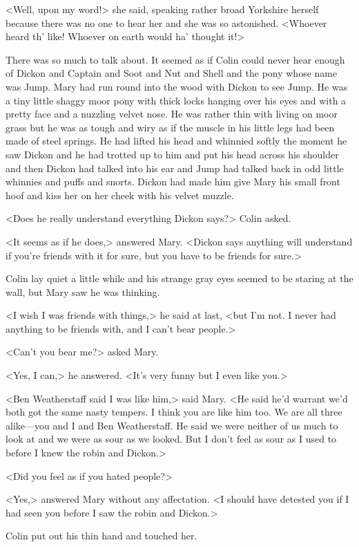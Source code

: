 <Well, upon my word!> she said, speaking rather broad Yorkshire herself because there was no one to hear her and she was so astonished. <Whoever heard th' like! Whoever on earth would ha' thought it!>

There was so much to talk about. It seemed as if Colin could never hear enough of Dickon and Captain and Soot and Nut and Shell and the pony whose name was Jump. Mary had run round into the wood with Dickon to see Jump. He was a tiny little shaggy moor pony with thick locks hanging over his eyes and with a pretty face and a nuzzling velvet nose. He was rather thin with living on moor grass but he was as tough and wiry as if the muscle in his little legs had been made of steel springs. He had lifted his head and whinnied softly the moment he saw Dickon and he had trotted up to him and put his head across his shoulder and then Dickon had talked into his ear and Jump had talked back in odd little whinnies and puffs and snorts. Dickon had made him give Mary his small front hoof and kiss her on her cheek with his velvet muzzle.

<Does he really understand everything Dickon says?> Colin asked.

<It seems as if he does,> answered Mary. <Dickon says anything will understand if you're friends with it for sure, but you have to be friends for sure.>

Colin lay quiet a little while and his strange gray eyes seemed to be staring at the wall, but Mary saw he was thinking.

<I wish I was friends with things,> he said at last, <but I'm not. I never had anything to be friends with, and I can't bear people.>

<Can't you bear me?> asked Mary.

<Yes, I can,> he answered. <It's very funny but I even like you.>

<Ben Weatherstaff said I was like him,> said Mary. <He said he'd warrant we'd both got the same nasty tempers. I think you are like him too. We are all three alike—you and I and Ben Weatherstaff. He said we were neither of us much to look at and we were as sour as we looked. But I don't feel as sour as I used to before I knew the robin and Dickon.>

<Did you feel as if you hated people?>

<Yes,> answered Mary without any affectation. <I should have detested you if I had seen you before I saw the robin and Dickon.>

Colin put out his thin hand and touched her.

